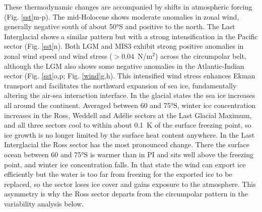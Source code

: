 \documentclass[pdflatex,sn-nature]{sn-jnl}
\begin{document}
These thermodynamic changes are accompanied by shifts in atmospheric forcing (Fig. \ref{sst}m-p). The mid-Holocene shows moderate anomalies in zonal wind, generally negative south of about 50°S and positive to the north. The Last Interglacial shows a similar pattern but with a strong intensification in the Pacific sector (Fig. \ref{sst}n). Both LGM and MIS3 exhibit strong positive anomalies in zonal wind speed and wind stress ($>0.04$~N/m$^2$) across the circumpolar belt, although the LGM also shows some negative anomalies in the Atlantic-Indian sector (Fig. \ref{sst}o,p; Fig. \ref{wind}g,h). This intensified wind stress enhances Ekman transport and facilitates the northward expansion of sea ice, fundamentally altering the air-sea interaction interface. In the glacial states the sea ice increases all around the continent. Averaged between 60 and 75°S, winter ice concentration increases in the Ross, Weddell and Ad\'elie sectors at the Last Glacial Maximum, and all three sectors cool to within about 0.1~K of the surface freezing point, so ice growth is no longer limited by the surface heat content anywhere. In the Last Interglacial the Ross sector has the most pronounced change. There the surface ocean between 60 and 75°S is warmer than in PI and sits well above the freezing point, and winter ice concentration falls. In that state the wind can export ice efficiently but the water is too far from freezing for the exported ice to be replaced, so the sector loses ice cover and gains exposure to the atmosphere. This asymmetry is why the Ross sector departs from the circumpolar pattern in the variability analysis below.
\end{document}
